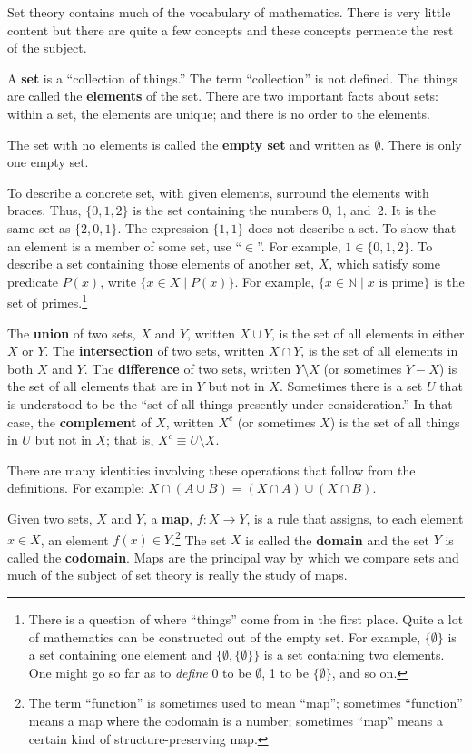 \documentclass[10pt, a4paper, twocolumn]{article}
\newcommand{\defn}[1]{\textbf{#1}}
\begin{document}
Set theory contains much of the vocabulary of mathematics. There is very little
content but there are quite a few concepts and these concepts permeate the rest
of the subject.

A \defn{set} is a “collection of things.” The term “collection” is not
defined. The things are called the \defn{elements} of the set. There are two
important facts about sets: within a set, the elements are unique; and there is
no order to the elements.

The set with no elements is called the \defn{empty set} and written as
$\emptyset$. There is only one empty set.

To describe a concrete set, with given elements, surround the elements with
braces. Thus, $\{0, 1, 2\}$ is the set containing the numbers 0, 1, and~2. It is
the same set as $\{2,0,1\}$. The expression $\{1, 1\}$ does not describe a
set. To show that an element is a member of some set, use “$\in$”. For example,
$1\in\{0,1,2\}$. To describe a set containing those elements of another set, $X$,
which satisfy some predicate $P(x)$, write $\{x \in X \mid P(x)\}$. For example, $\{x
\in \mathbb{N} \mid \text{$x$ is prime}\}$ is the set of primes.\footnote{There is a
  question of where “things” come from in the first place. Quite a lot of
  mathematics can be constructed out of the empty set. For example, $\{\emptyset\}$ is a
  set containing one element and $\{\emptyset, \{\emptyset\}\}$ is a set containing two
  elements. One might go so far as to \emph{define} 0 to be $\emptyset$, 1 to be
  $\{\emptyset\}$, and so on.}

The \defn{union} of two sets, $X$ and $Y$, written $X \cup Y$, is the set of all
elements in either $X$ or $Y$. The \defn{intersection} of two sets, written $X \cap
Y$, is the set of all elements in both $X$ and $Y$. The \defn{difference} of two
sets, written $Y \setminus X$ (or sometimes $Y-X$) is the set of all elements that are
in $Y$ but not in $X$. Sometimes there is a set $U$ that is understood to be the
“set of all things presently under consideration.” In that case, the
\defn{complement} of $X$, written $X^c$ (or sometimes $\bar{X}$) is the set of
all things in $U$ but not in $X$; that is, $X^c \equiv U \setminus X$.

There are many identities involving these operations that follow from the
definitions. For example: $X\cap(A\cup B) = (X\cap A)\cup (X\cap B)$. 

Given two sets, $X$ and $Y$, a \defn{map}, $f : X \to Y$, is a rule that assigns,
to each element $x \in X$, an element $f(x) \in Y$.\footnote{The term “function” is
  sometimes used to mean “map”; sometimes “function” means a map where the
  codomain is a number; sometimes “map” means a certain kind of
  structure-preserving map.} The set $X$ is called the \defn{domain} and the set
$Y$ is called the \defn{codomain}. Maps are the principal way by which we
compare sets and much of the subject of set theory is really the study of maps.
\end{document}
